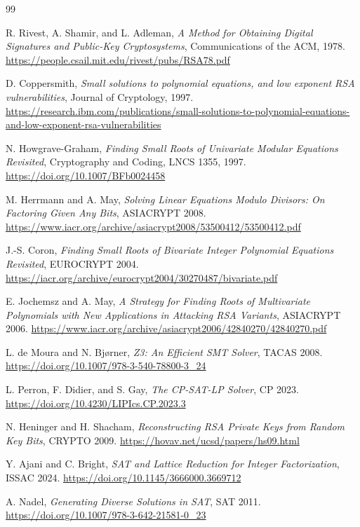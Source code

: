 \documentclass[10pt,a4paper]{article}
\begin{document}
\begin{thebibliography}{99}

R. Rivest, A. Shamir, and L. Adleman,
\emph{A Method for Obtaining Digital Signatures and Public-Key Cryptosystems},
Communications of the ACM, 1978.
\url{https://people.csail.mit.edu/rivest/pubs/RSA78.pdf}

D. Coppersmith,
\emph{Small solutions to polynomial equations, and low exponent RSA vulnerabilities},
Journal of Cryptology, 1997.
\url{https://research.ibm.com/publications/small-solutions-to-polynomial-equations-and-low-exponent-rsa-vulnerabilities}

N. Howgrave-Graham,
\emph{Finding Small Roots of Univariate Modular Equations Revisited},
Cryptography and Coding, LNCS 1355, 1997.
\url{https://doi.org/10.1007/BFb0024458}

M. Herrmann and A. May,
\emph{Solving Linear Equations Modulo Divisors: On Factoring Given Any Bits},
ASIACRYPT 2008.
\url{https://www.iacr.org/archive/asiacrypt2008/53500412/53500412.pdf}

J.-S. Coron,
\emph{Finding Small Roots of Bivariate Integer Polynomial Equations Revisited},
EUROCRYPT 2004.
\url{https://iacr.org/archive/eurocrypt2004/30270487/bivariate.pdf}

E. Jochemsz and A. May,
\emph{A Strategy for Finding Roots of Multivariate Polynomials with New
Applications in Attacking RSA Variants}, ASIACRYPT 2006.
\url{https://www.iacr.org/archive/asiacrypt2006/42840270/42840270.pdf}

L. de Moura and N. Bj{\o}rner,
\emph{Z3: An Efficient SMT Solver}, TACAS 2008.
\url{https://doi.org/10.1007/978-3-540-78800-3_24}

L. Perron, F. Didier, and S. Gay,
\emph{The CP-SAT-LP Solver}, CP 2023.
\url{https://doi.org/10.4230/LIPIcs.CP.2023.3}

N. Heninger and H. Shacham,
\emph{Reconstructing RSA Private Keys from Random Key Bits}, CRYPTO 2009.
\url{https://hovav.net/ucsd/papers/hs09.html}

Y. Ajani and C. Bright,
\emph{SAT and Lattice Reduction for Integer Factorization}, ISSAC 2024.
\url{https://doi.org/10.1145/3666000.3669712}

A. Nadel,
\emph{Generating Diverse Solutions in SAT}, SAT 2011.
\url{https://doi.org/10.1007/978-3-642-21581-0_23}


\end{thebibliography}
\end{document}
